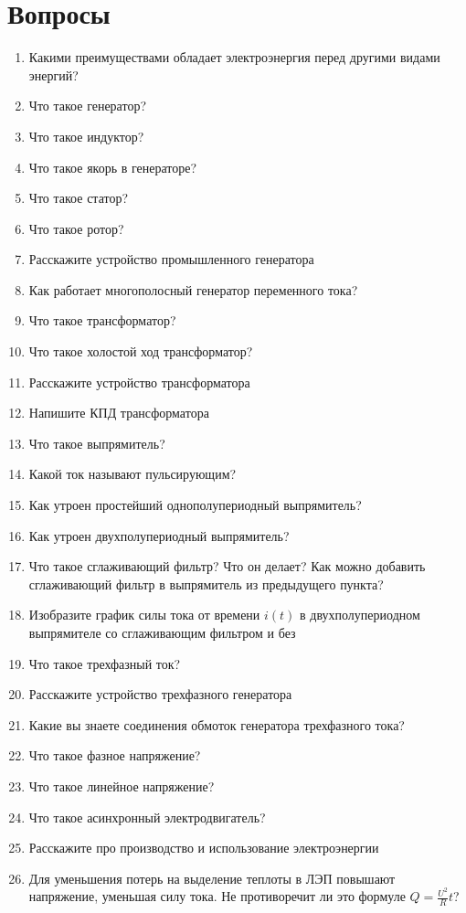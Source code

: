 \documentclass[12pt,a4paper]{report}
\begin{document}
\section{Вопросы}
\begin{enumerate}
\item Какими преимуществами обладает электроэнергия перед другими видами энергий?
\item Что такое генератор?
\item Что такое индуктор?
\item Что такое якорь в генераторе?
\item Что такое статор?
\item Что такое ротор?
\item Расскажите устройство промышленного генератора
\item Как работает многополосный генератор переменного тока?
\item Что такое трансформатор?
\item Что такое холостой ход трансформатор?
\item Расскажите устройство трансформатора
\item Напишите КПД трансформатора
\item Что такое выпрямитель?
\item Какой ток называют пульсирующим?
\item Как утроен простейший однополупериодный выпрямитель?
\item Как утроен двухполупериодный выпрямитель?
\item Что такое сглаживающий фильтр? Что он делает? Как можно добавить сглаживающий фильтр в выпрямитель из предыдущего пункта?
\item Изобразите график силы тока от времени $i(t)$ в двухполупериодном выпрямителе со сглаживающим фильтром и без
\item Что такое трехфазный ток?
\item Расскажите устройство трехфазного генератора
\item Какие вы знаете соединения обмоток генератора трехфазного тока?
\item Что такое фазное напряжение?
\item Что такое линейное напряжение?
\item Что такое асинхронный электродвигатель?
\item Расскажите про производство и использование электроэнергии
\item Для уменьшения потерь на выделение теплоты в ЛЭП повышают напряжение, уменьшая силу тока. Не противоречит ли это формуле $Q = \frac{U^2}{R}t$?
\end{enumerate}
\end{document}
